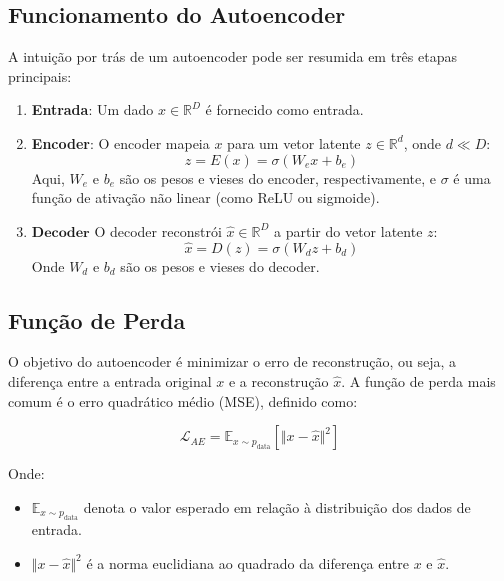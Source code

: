 \documentclass{tufte-handout}
\begin{document}
\subsection{Funcionamento do Autoencoder}

A intuição por trás de um autoencoder pode ser resumida em três etapas principais:
\begin{enumerate}
    \item \textbf{Entrada}: Um dado $x \in \mathbb{R}^D$ é fornecido como entrada.
    \item \textbf{Encoder}: O encoder mapeia $x$ para um vetor latente $z \in \mathbb{R}^d$, onde $d \ll D$:
   \begin{equation}
       z = E(x) = \sigma(W_e x + b_e)
   \end{equation}
   Aqui, $W_e$ e $b_e$ são os pesos e vieses do encoder, respectivamente, e $\sigma$ é uma função de ativação não linear (como ReLU ou sigmoide).
   \item $\mathbf{Decoder}$ O decoder reconstrói $\hat{x} \in \mathbb{R}^D$ a partir do vetor latente $z$:
   \begin{equation}
       \hat{x} = D(z) = \sigma(W_d z + b_d)
   \end{equation}
   Onde $W_d$ e $b_d$ são os pesos e vieses do decoder.
\end{enumerate}

\subsection{Função de Perda}

O objetivo do autoencoder é minimizar o erro de reconstrução, ou seja, a diferença entre a entrada original $x$ e a reconstrução $\hat{x}$. 
A função de perda mais comum é o erro quadrático médio (MSE), definido como:

\begin{equation}
    \mathcal{L}_{AE} = \mathbb{E}_{x \sim p_{\text{data}}} \left[ \Vert x - \hat{x} \Vert^2 \right]
\end{equation}

Onde:
\begin{itemize}
    \item $\mathbb{E}_{x \sim p_{\text{data}}}$ denota o valor esperado em relação à distribuição dos dados de entrada.
    \item $\Vert x - \hat{x} \Vert^2$ é a norma euclidiana ao quadrado da diferença entre $x$ e $\hat{x}$.
\end{itemize}
\end{document}
